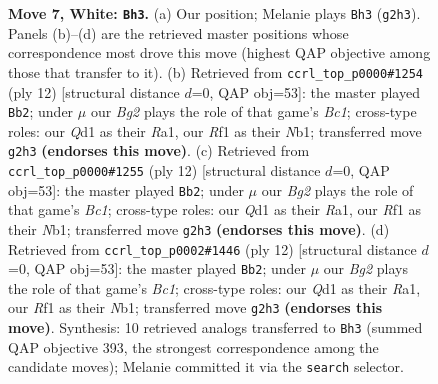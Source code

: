 \documentclass[11pt]{article}
\begin{document}
\begin{figure}[p]
\caption{\textbf{Move 7, White: \texttt{Bh3}.} (a) Our position; Melanie plays \texttt{Bh3} (\texttt{g2h3}). Panels (b)--(d) are the retrieved master positions whose correspondence most drove this move (highest QAP objective among those that transfer to it). (b) Retrieved from \texttt{ccrl\_top\_p0000\#1254} (ply 12) [structural distance $d$=0, QAP obj=53]: the master played \texttt{Bb2}; under $\mu$ our \emph{Bg2} plays the role of that game's \emph{Bc1}; cross-type roles: our \emph{Q}d1 as their \emph{R}a1, our \emph{R}f1 as their \emph{N}b1; transferred move \texttt{g2h3} \textbf{(endorses this move)}. (c) Retrieved from \texttt{ccrl\_top\_p0000\#1255} (ply 12) [structural distance $d$=0, QAP obj=53]: the master played \texttt{Bb2}; under $\mu$ our \emph{Bg2} plays the role of that game's \emph{Bc1}; cross-type roles: our \emph{Q}d1 as their \emph{R}a1, our \emph{R}f1 as their \emph{N}b1; transferred move \texttt{g2h3} \textbf{(endorses this move)}. (d) Retrieved from \texttt{ccrl\_top\_p0002\#1446} (ply 12) [structural distance $d$=0, QAP obj=53]: the master played \texttt{Bb2}; under $\mu$ our \emph{Bg2} plays the role of that game's \emph{Bc1}; cross-type roles: our \emph{Q}d1 as their \emph{R}a1, our \emph{R}f1 as their \emph{N}b1; transferred move \texttt{g2h3} \textbf{(endorses this move)}. Synthesis: 10 retrieved analogs transferred to \texttt{Bh3} (summed QAP objective 393, the strongest correspondence among the candidate moves); Melanie committed it via the \texttt{search} selector.}
\label{fig:thought-m12}
\end{figure}

\clearpage
\end{document}
